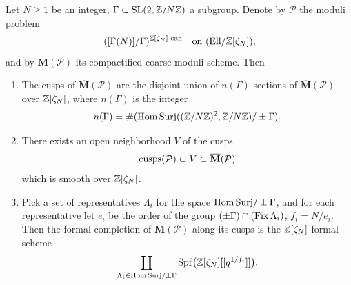 \begin{kthm}\label{thm:10.9.1}
Let $N \ge 1$ be an integer, $\Gamma \subset \operatorname{SL}(2, \mathbb{Z}/N\mathbb{Z})$ a subgroup. Denote by $\mathcal{P}$ the moduli problem
\[
([\Gamma(N)]/\Gamma)^{\mathbb{Z}[\zeta_N]\text{-can}} \quad\text{on } (\mathrm{Ell}/\mathbb{Z}[\zeta_N]) ,
\]
and by $\overline{\mathbf{M}}(\mathcal{P})$ its compactified coarse moduli scheme. Then
\begin{enumerate}[label=(\arabic*)]
\item The cusps of $\overline{\mathbf{M}}(\mathcal{P})$ are the disjoint union of $n(\Gamma)$ sections of $\overline{\mathbf{M}}(\mathcal{P})$ over $\mathbb{Z}[\zeta_N]$, where $n(\Gamma)$ is the integer
\[
n(\Gamma) = \#(\mathrm{Hom\,Surj}((\mathbb{Z}/N\mathbb{Z})^2, \mathbb{Z}/N\mathbb{Z})/\pm\Gamma) .
\]
\item There exists an open neighborhood $V$ of the cusps
\[
\operatorname{cusps}(\mathcal{P}) \subset V \subset \overline{\mathbf{M}}(\mathcal{P})
\]
which is smooth over $\mathbb{Z}[\zeta_N]$.
\item Pick a set of representatives $\Lambda_i$ for the space $\mathrm{Hom\,Surj}/\pm\Gamma$, and for each representative let $e_i$ be the order of the group $(\pm\Gamma)\cap(\operatorname{Fix}\Lambda_i)$, $f_i = N/e_i$. Then the formal completion of $\overline{\mathbf{M}}(\mathcal{P})$ along its cusps is the $\mathbb{Z}[\zeta_N]$-formal scheme
\[
\coprod_{\Lambda_i \in \mathrm{Hom\,Surj}/\pm\Gamma} \operatorname{Spf}\bigl(\mathbb{Z}[\zeta_N][[q^{1/f_i}]]\bigr) .
\]
\end{enumerate}
\end{kthm}


